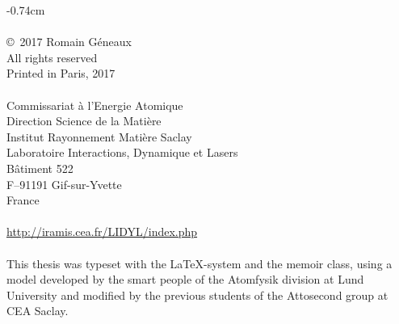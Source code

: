 \thispagestyle{empty}

\clearpage

\thispagestyle{empty}
\begin{narrow}{-0.7\marginwidth}{4cm}
    \vspace*{\fill}
    \footnotesize
    \noindent \textsc{\thesistitle}\\
    \vspace*{0.1cm}\\
    \noindent \copyright~2017 Romain Géneaux\\
    \noindent All rights reserved\\
    \noindent Printed in Paris, 2017\\
    \vspace*{0.1cm}\\
    \noindent Commissariat à l'Energie Atomique\\
    \noindent Direction Science de la Mati\`ere\\
    \noindent Institut Rayonnement Mati\`ere Saclay\\
    \noindent Laboratoire Interactions, Dynamique et Lasers\\
    \noindent B\^atiment 522\\
    \noindent F--91191 Gif-sur-Yvette\\
    \noindent France\\
    \vspace*{-0.2cm}\\
    \noindent \url{http://iramis.cea.fr/LIDYL/index.php}\\
    \vspace*{0.1cm}\\
    \noindent This thesis was typeset with the \LaTeX -system and the memoir class, using a model developed by the smart people of the Atomfysik division at Lund University and modified by the previous students of the Attosecond group at CEA Saclay.
\end{narrow}


